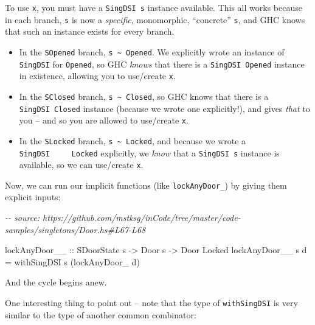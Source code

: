 \documentclass[]{article}
\newenvironment{Shaded}{}{}
\newcommand{\CommentTok}[1]{\textcolor[rgb]{0.38,0.63,0.69}{\textit{#1}}}
\newcommand{\DataTypeTok}[1]{\textcolor[rgb]{0.56,0.13,0.00}{#1}}
\newcommand{\NormalTok}[1]{#1}
\newcommand{\OtherTok}[1]{\textcolor[rgb]{0.00,0.44,0.13}{#1}}
\begin{document}
To use \texttt{x}, you must have a \texttt{SingDSI\ s} instance available. This
all works because in each branch, \texttt{s} is now a \emph{specific},
monomorphic, ``concrete'' \texttt{s}, and GHC knows that such an instance exists
for every branch.

\begin{itemize}
\tightlist
\item
  In the \texttt{SOpened} branch,
  \texttt{s\ \textasciitilde{}\ \textquotesingle{}Opened}. We explicitly wrote
  an instance of \texttt{SingDSI} for \texttt{\textquotesingle{}Opened}, so GHC
  \emph{knows} that there is a \texttt{SingDSI\ \textquotesingle{}Opened}
  instance in existence, allowing you to use/create \texttt{x}.
\item
  In the \texttt{SClosed} branch,
  \texttt{s\ \textasciitilde{}\ \textquotesingle{}Closed}, so GHC knows that
  there is a \texttt{SingDSI\ \textquotesingle{}Closed} instance (because we
  wrote one explicitly!), and gives \emph{that} to you -- and so you are allowed
  to use/create \texttt{x}.
\item
  In the \texttt{SLocked} branch,
  \texttt{s\ \textasciitilde{}\ \textquotesingle{}Locked}, and because we wrote
  a \texttt{SingDSI\ \ \ \ \ \textquotesingle{}Locked} explicitly, we
  \emph{know} that a \texttt{SingDSI\ s} instance is available, so we can
  use/create \texttt{x}.
\end{itemize}

Now, we can run our implicit functions (like \texttt{lockAnyDoor\_}) by giving
them explicit inputs:

\begin{Shaded}
\begin{Highlighting}[]
\CommentTok{{-}{-} source: https://github.com/mstksg/inCode/tree/master/code{-}samples/singletons/Door.hs\#L67{-}L68}

\OtherTok{lockAnyDoor\_\_ ::} \DataTypeTok{SDoorState}\NormalTok{ s }\OtherTok{{-}\textgreater{}} \DataTypeTok{Door}\NormalTok{ s }\OtherTok{{-}\textgreater{}} \DataTypeTok{Door} \DataTypeTok{\textquotesingle{}Locked}
\NormalTok{lockAnyDoor\_\_ s d }\OtherTok{=}\NormalTok{ withSingDSI s (lockAnyDoor\_ d)}
\end{Highlighting}
\end{Shaded}

And the cycle begins anew.

One interesting thing to point out -- note that the type of \texttt{withSingDSI}
is very similar to the type of another common combinator:
\end{document}

